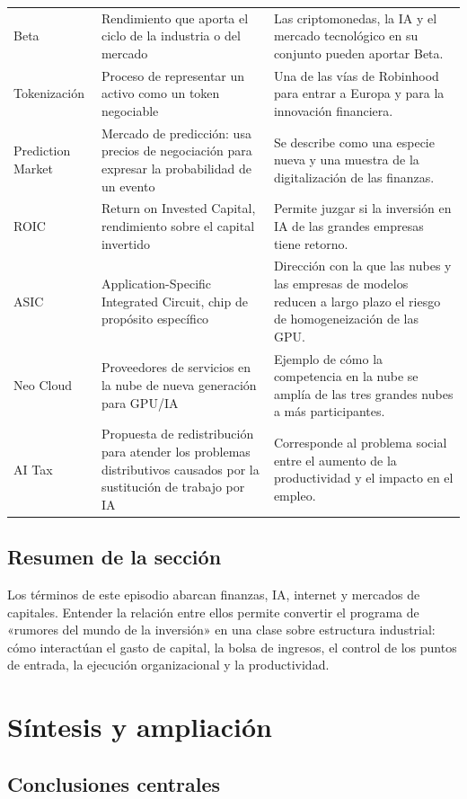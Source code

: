 \documentclass[a4paper]{article}
\begin{document}
\begin{longtable}{p{}p{}p{}}
Beta & Rendimiento que aporta el ciclo de la industria o del mercado & Las criptomonedas, la IA y el mercado tecnológico en su conjunto pueden aportar Beta. \\
Tokenización & Proceso de representar un activo como un token negociable & Una de las vías de Robinhood para entrar a Europa y para la innovación financiera. \\
Prediction Market & Mercado de predicción: usa precios de negociación para expresar la probabilidad de un evento & Se describe como una especie nueva y una muestra de la digitalización de las finanzas. \\
ROIC & Return on Invested Capital, rendimiento sobre el capital invertido & Permite juzgar si la inversión en IA de las grandes empresas tiene retorno. \\
ASIC & Application-Specific Integrated Circuit, chip de propósito específico & Dirección con la que las nubes y las empresas de modelos reducen a largo plazo el riesgo de homogeneización de las GPU. \\
Neo Cloud & Proveedores de servicios en la nube de nueva generación para GPU/IA & Ejemplo de cómo la competencia en la nube se amplía de las tres grandes nubes a más participantes. \\
AI Tax & Propuesta de redistribución para atender los problemas distributivos causados por la sustitución de trabajo por IA & Corresponde al problema social entre el aumento de la productividad y el impacto en el empleo. \\
\bottomrule
\end{longtable}

\subsection{Resumen de la sección}

Los términos de este episodio abarcan finanzas, IA, internet y mercados de capitales. Entender la relación entre ellos permite convertir el programa de «rumores del mundo de la inversión» en una clase sobre estructura industrial: cómo interactúan el gasto de capital, la bolsa de ingresos, el control de los puntos de entrada, la ejecución organizacional y la productividad.
\section{Síntesis y ampliación}

\subsection{Conclusiones centrales}
\end{document}
